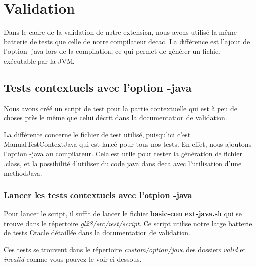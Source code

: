 \documentclass[12pt, a4paper, one side]{article}
\begin{document}
    \newpage
    \section{Validation}
    Dans le cadre de la validation de notre extension, nous avons utilisé la même batterie de tests que celle de notre compilateur decac. La différence est l'ajout de l'option -java lors de la compilation, ce qui permet de générer un fichier exécutable par la JVM.

    \subsection{Tests contextuels avec l'option -java}
    Nous avons créé un script de test pour la partie contextuelle qui est à peu de choses près le même que celui décrit dans la documentation de validation.
    \begin{flushleft}
        La différence concerne le fichier de test utilisé, puisqu'ici c'est ManualTestContextJava qui est lancé pour tous nos tests. En effet, nous ajoutons l'option -java au compilateur. Cela est utile pour tester la génération de fichier .class, et la possibilité d'utiliser du code java dans deca avec l'utilisation d'une methodJava.
    \end{flushleft}

    \subsubsection{Lancer les tests contextuels avec l'otpion -java}
    Pour lancer le script, il suffit de lancer le fichier \textbf{basic-context-java.sh} qui se trouve dans le répertoire \textit{gl28/src/test/script}. Ce script utilise notre large batterie de tests Oracle détaillée dans la documentation de validation.
    \begin{flushleft}
        Ces tests se trouvent dans le répertoire \textit{custom/option/java} des dossiers \textit{valid} et \textit{invalid} comme vous pouvez le voir ci-dessous.
    \end{flushleft}
\end{document}
